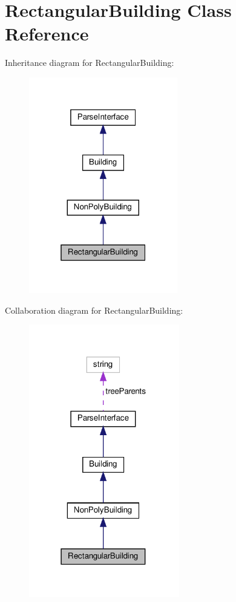\hypertarget{classRectangularBuilding}{}\section{Rectangular\+Building Class Reference}
\label{classRectangularBuilding}


Inheritance diagram for Rectangular\+Building\+:
\nopagebreak
\begin{figure}[H]
\begin{center}
\leavevmode
\includegraphics[width=184pt]{classRectangularBuilding__inherit__graph}
\end{center}
\end{figure}


Collaboration diagram for Rectangular\+Building\+:
\nopagebreak
\begin{figure}[H]
\begin{center}
\leavevmode
\includegraphics[width=186pt]{classRectangularBuilding__coll__graph}
\end{center}
\end{figure}
